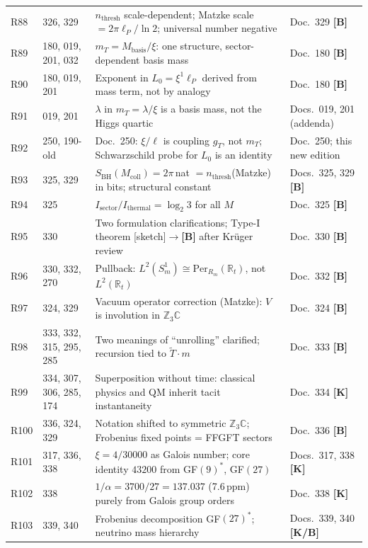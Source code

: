 \begin{longtable}{@{}p{1.2cm}p{3.4cm}p{5.8cm}p{3.4cm}@{}}
R88 & 326, 329 & $n_{\mathrm{thresh}}$ scale-dependent; Matzke scale $=2\pi\ell_P/\ln 2$; universal number negative & Doc.~329 \textbf{[B]} \\
R89 & 180, 019, 201, 032 & $m_T = M_\mathrm{basis}/\xi$: one structure, sector-dependent basis mass & Doc.~180 \textbf{[B]} \\
R90 & 180, 019, 201 & Exponent in $L_0=\xi^1\ell_P$ derived from mass term, not by analogy & Doc.~180 \textbf{[B]} \\
R91 & 019, 201 & $\lambda$ in $m_T=\lambda/\xi$ is a basis mass, not the Higgs quartic & Docs.~019, 201 (addenda) \\
R92 & 250, 190-old & Doc.~250: $\xi/\ell$ is coupling $g_T$, not $m_T$; Schwarzschild probe for $L_0$ is an identity & Doc.~250; this new edition \\
R93 & 325, 329 & $S_\mathrm{BH}(M_\mathrm{coll})=2\pi$\,nat $=n_\mathrm{thresh}$(Matzke) in bits; structural constant & Docs.~325, 329 \textbf{[B]} \\
R94 & 325 & $I_\mathrm{sector}/I_\mathrm{thermal}=\log_2 3$ for all $M$ & Doc.~325 \textbf{[B]} \\
R95 & 330 & Two formulation clarifications; Type-I theorem [sketch]$\to$\textbf{[B]} after Krüger review & Doc.~330 \textbf{[B]} \\
R96 & 330, 332, 270 & Pullback: $L^2(S^1_m)\cong\mathrm{Per}_{R_m}(\mathbb{R}_t)$, not $L^2(\mathbb{R}_t)$ & Doc.~332 \textbf{[B]} \\
R97 & 324, 329 & Vacuum operator correction (Matzke): $V$ is involution in $\mathbb{Z}_3\mathbb{C}$ & Doc.~324 \textbf{[B]} \\
R98 & 333, 332, 315, 295, 285 & Two meanings of ``unrolling'' clarified; recursion tied to $\tilde{T}\cdot m$ & Doc.~333 \textbf{[B]} \\
R99 & 334, 307, 306, 285, 174 & Superposition without time: classical physics and QM inherit tacit instantaneity & Doc.~334 \textbf{[K]} \\
R100 & 336, 324, 329 & Notation shifted to symmetric $\mathbb{Z}_3\mathbb{C}$; Frobenius fixed points = FFGFT sectors & Doc.~336 \textbf{[B]} \\
R101 & 317, 336, 338 & $\xi=4/30000$ as Galois number; core identity $43200$ from GF$(9)^*$, GF$(27)$ & Docs.~317, 338 \textbf{[K]} \\
R102 & 338 & $1/\alpha=3700/27=137.037$ (7.6\,ppm) purely from Galois group orders & Doc.~338 \textbf{[K]} \\
R103 & 339, 340 & Frobenius decomposition GF$(27)^*$; neutrino mass hierarchy & Docs.~339, 340 \textbf{[K/B]} \\

\end{longtable}
